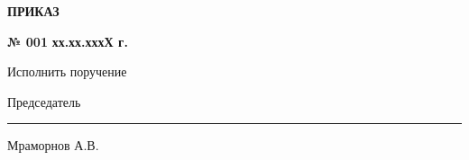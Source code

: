 \begin{center}
	\LARGE\textbf{ ПРИКАЗ}
\end{center}
\par
\textbf{№ 001} \hfill   \textbf{хх.хх.хххХ г.}\\[10mm]
\relax

Исполнить поручение 

\vspace{35mm}
Председатель \hfill    \rule{4cm}{0.1 mm}    Мраморнов А.В.




